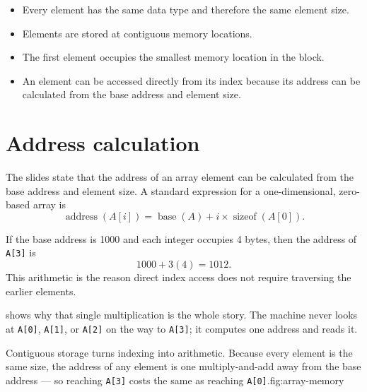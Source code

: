 \begin{itemize}
  \item Every element has the same data type and therefore the same element size.
  \item Elements are stored at contiguous memory locations.
  \item The first element occupies the smallest memory location in the block.
  \item An element can be accessed directly from its index because its address can be calculated from the base address and element size.
\end{itemize}

\section{Address calculation}

The slides state that the address of an array element can be calculated from the base address and element size. A standard expression for a one-dimensional, zero-based array is
\[
\operatorname{address}(A[i]) = \operatorname{base}(A) + i \times \operatorname{sizeof}(A[0]).
\]

\begin{workedexample}
If the base address is 1000 and each integer occupies 4 bytes, then the address of \texttt{A[3]} is
\[
1000 + 3(4) = 1012.
\]
This arithmetic is the reason direct index access does not require traversing the earlier elements.
\end{workedexample}

 shows why that single multiplication is the whole story. The
machine never looks at \texttt{A[0]}, \texttt{A[1]}, or \texttt{A[2]} on the way to
\texttt{A[3]}; it computes one address and reads it.

\begin{adsfig}{Contiguous storage turns indexing into arithmetic. Because every element is
the same size, the address of any element is one multiply-and-add away from the base
address --- so reaching \texttt{A[3]} costs the same as reaching
\texttt{A[0]}.}{fig:array-memory}
\end{adsfig}

